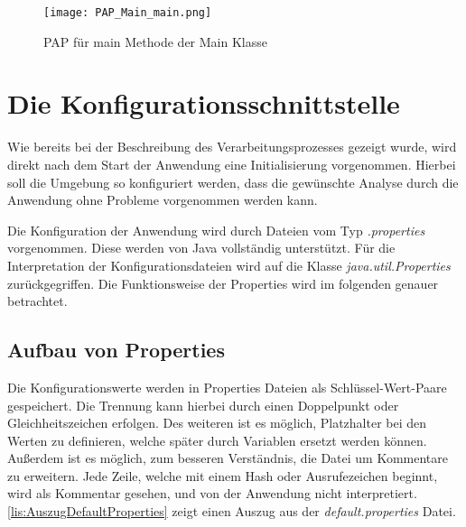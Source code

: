 \begin{figure}[h]
	\centering
	\texttt{[image: PAP\_Main\_main.png]}
	\caption{PAP für main Methode der Main Klasse}
	\label{fig:PAP_Main_main}
\end{figure}


\section{Die Konfigurationsschnittstelle}
Wie bereits bei der Beschreibung des Verarbeitungsprozesses gezeigt wurde, wird direkt nach dem Start der Anwendung eine Initialisierung vorgenommen. Hierbei soll die Umgebung so konfiguriert werden, dass die gewünschte Analyse durch die Anwendung ohne Probleme vorgenommen werden kann.

Die Konfiguration der Anwendung wird durch Dateien vom Typ \textit{.properties} vorgenommen. Diese werden von Java vollständig unterstützt. Für die Interpretation der Konfigurationsdateien wird auf die Klasse \textit{java.util.Properties} zurückgegriffen. Die Funktionsweise der Properties wird im folgenden genauer betrachtet.

\subsection{Aufbau von Properties}
Die Konfigurationswerte werden in Properties Dateien als Schlüssel-Wert-Paare gespeichert. Die Trennung kann hierbei durch einen Doppelpunkt oder Gleichheitszeichen erfolgen. Des weiteren ist es möglich, Platzhalter bei den Werten zu definieren, welche später durch Variablen ersetzt werden können. Außerdem ist es möglich, zum besseren Verständnis, die Datei um Kommentare zu erweitern. Jede Zeile, welche mit einem Hash oder Ausrufezeichen beginnt, wird als Kommentar gesehen, und von der Anwendung nicht interpretiert. \autoref{lis:AuszugDefaultProperties} zeigt einen Auszug aus der \textit{default.properties} Datei. \\

